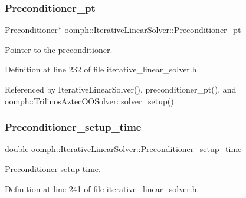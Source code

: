 \mbox{\label{classoomph_1_1IterativeLinearSolver_a55111d8d76589944d81d13b5e15f7248}} 
\subsubsection{\texorpdfstring{Preconditioner\+\_\+pt}{Preconditioner\_pt}}
{\footnotesize\ttfamily \hyperlink{classoomph_1_1Preconditioner}{Preconditioner}$\ast$ oomph\+::\+Iterative\+Linear\+Solver\+::\+Preconditioner\+\_\+pt\hspace{0.3cm}{\ttfamily [protected]}}



Pointer to the preconditioner. 



Definition at line 232 of file iterative\+\_\+linear\+\_\+solver.\+h.



Referenced by Iterative\+Linear\+Solver(), preconditioner\+\_\+pt(), and oomph\+::\+Trilinos\+Aztec\+O\+O\+Solver\+::solver\+\_\+setup().

\mbox{\label{classoomph_1_1IterativeLinearSolver_a8022e90c9c7c720a0bacf9d090c81a10}} 
\subsubsection{\texorpdfstring{Preconditioner\+\_\+setup\+\_\+time}{Preconditioner\_setup\_time}}
{\footnotesize\ttfamily double oomph\+::\+Iterative\+Linear\+Solver\+::\+Preconditioner\+\_\+setup\+\_\+time\hspace{0.3cm}{\ttfamily [protected]}}



\hyperlink{classoomph_1_1Preconditioner}{Preconditioner} setup time. 



Definition at line 241 of file iterative\+\_\+linear\+\_\+solver.\+h.



